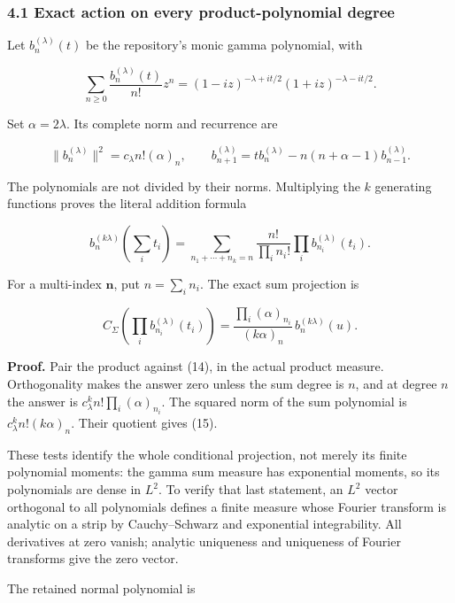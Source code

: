 \subsubsection{4.1 Exact action on every product-polynomial
degree}\label{gamma_convolution:exact-action-on-every-product-polynomial-degree}

Let \(b_n^{(\lambda)}(t)\) be the repository's monic gamma polynomial, with

\[
\sum_{n\ge0}\frac{b_n^{(\lambda)}(t)}{n!}z^n
=(1-iz)^{-\lambda+it/2}(1+iz)^{-\lambda-it/2}.
\]

Set \(\alpha=2\lambda\). Its complete norm and recurrence are

\[
\|b_n^{(\lambda)}\|^2=c_\lambda n!(\alpha)_n,\qquad
b_{n+1}^{(\lambda)}=t b_n^{(\lambda)}-n(n+\alpha-1)b_{n-1}^{(\lambda)}.
                                                                    \tag{13}
\]

The polynomials are not divided by their norms. Multiplying the \(k\) generating functions proves
the literal addition formula

\[
b_n^{(k\lambda)}(\sum_i t_i)
=\sum_{n_1+\cdots+n_k=n}\frac{n!}{\prod_i n_i!}
                         \prod_i b_{n_i}^{(\lambda)}(t_i).         \tag{14}
\]

For a multi-index \(\mathbf n\), put \(n=\sum_i n_i\). The exact sum projection is

\[
\boxed{
C_\Sigma\left(\prod_i b_{n_i}^{(\lambda)}(t_i)\right)
 =\frac{\prod_i(\alpha)_{n_i}}{(k\alpha)_n}\,b_n^{(k\lambda)}(u).
}                                                                   \tag{15}
\]

\textbf{Proof.} Pair the product against (14), in the actual product measure. Orthogonality makes
the answer zero unless the sum degree is \(n\), and at degree \(n\) the answer is
\(c_\lambda^k n!\prod_i(\alpha)_{n_i}\). The squared norm of the sum polynomial is
\(c_\lambda^k n!(k\alpha)_n\). Their quotient gives (15).

These tests identify the whole conditional projection, not merely its finite polynomial moments: the
gamma sum measure has exponential moments, so its polynomials are dense in \(L^2\). To verify that
last statement, an \(L^2\) vector orthogonal to all polynomials defines a finite measure whose
Fourier transform is analytic on a strip by Cauchy--Schwarz and exponential integrability. All
derivatives at zero vanish; analytic uniqueness and uniqueness of Fourier transforms give the zero
vector.

The retained normal polynomial is

